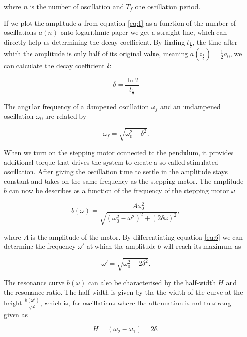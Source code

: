 \documentclass{article}
\begin{document}
where $n$ is the number of oscillation and $T_f$ one oscillation period.

If we plot the amplitude $a$ from equation \ref{eq:1} as a function of the number of oscillations $a(n)$ onto logarithmic paper we get a straight line, which can directly help us determining the decay coefficient. By finding $t_\frac{1}{2}$, the time after which the amplitude is only half of its original value, meaning $a(t_\frac{1}{2}) = \frac{1}{2} a_0$, we can calculate the decay coefficient $\delta$:

\begin{equation}
    \delta = \frac{\ln{2}}{t_\frac{1}{2}}
    \label{eq:4}
\end{equation}

The angular frequency of a dampened oscillation $\omega_f$ and an undampened oscillation $\omega_0$ are related by 

\begin{equation}
    \omega_f = \sqrt{\omega_0^2 - \delta^2}.
    \label{eq:5}
\end{equation}

When we turn on the stepping motor connected to the pendulum, it provides additional torque that drives the system to create a so called stimulated oscillation. After giving the oscillation time to settle in the amplitude stays constant and takes on the same frequency as the stepping motor. The amplitude $b$ can now be describes as a function of the frequency of the stepping motor $\omega$ 

\begin{equation}
    b(\omega) = \frac{A \omega_0^2}{\sqrt{(\omega_0^2 - \omega^2)^2 + (2\delta\omega)^2}},
    \label{eq:6}
\end{equation}

where $A$ is the amplitude of the motor. By differentiating equation \ref{eq:6} we can determine the frequency $\omega'$ at which the amplitude $b$ will reach its maximum as

\begin{equation}
    \omega' = \sqrt{\omega_0^2 - 2\delta^2}.
    \label{eq:7}
\end{equation}

The resonance curve $b(\omega)$ can also be characterised by the half-width $H$ and the resonance ratio. The half-width is given by the the width of the curve at the height $\frac{b(\omega')}{\sqrt{2}}$, which is, for oscillations where the attenuation is not to strong, given as 

\begin{equation}
    H = (\omega_2 - \omega_1) = 2\delta .
    \label{eq:8}
\end{equation}
\end{document}

